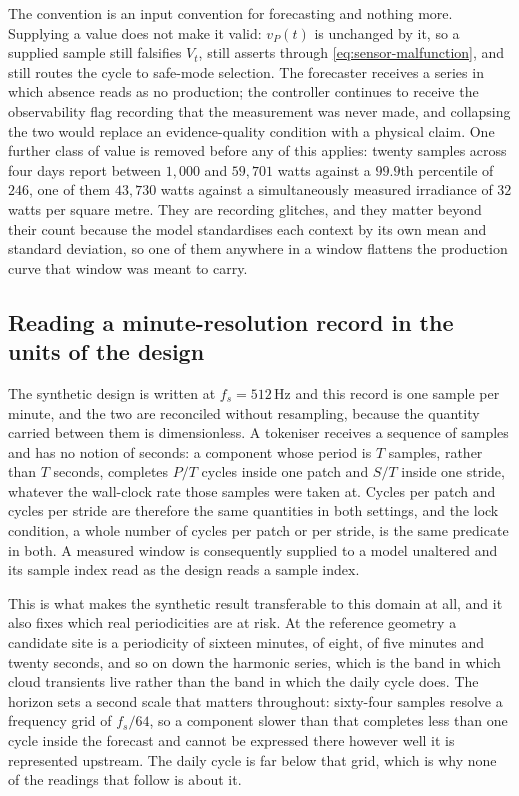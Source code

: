 The convention is an input convention for forecasting and nothing more. Supplying a value does not make it valid: $v_P(t)$ is unchanged by it, so a supplied sample still falsifies $V_t$, still asserts  through \autoref{eq:sensor-malfunction}, and still routes the cycle to safe-mode selection. The forecaster receives a series in which absence reads as no production; the controller continues to receive the observability flag recording that the measurement was never made, and collapsing the two would replace an evidence-quality condition with a physical claim. One further class of value is removed before any of this applies: twenty samples across four days report between $1{,}000$ and $59{,}701$ watts against a $99.9$th percentile of $246$, one of them $43{,}730$ watts against a simultaneously measured irradiance of $32$ watts per square metre. They are recording glitches, and they matter beyond their count because the model standardises each context by its own mean and standard deviation, so one of them anywhere in a window flattens the production curve that window was meant to carry.

\subsection{Reading a minute-resolution record in the units of the design}

The synthetic design is written at $f_s=512$\,Hz and this record is one sample per minute, and the two are reconciled without resampling, because the quantity carried between them is dimensionless. A tokeniser receives a sequence of samples and has no notion of seconds: a component whose period is $T$ samples, rather than $T$ seconds, completes $P/T$ cycles inside one patch and $S/T$ inside one stride, whatever the wall-clock rate those samples were taken at. Cycles per patch and cycles per stride are therefore the same quantities in both settings, and the lock condition, a whole number of cycles per patch or per stride, is the same predicate in both. A measured window is consequently supplied to a model unaltered and its sample index read as the design reads a sample index.

This is what makes the synthetic result transferable to this domain at all, and it also fixes which real periodicities are at risk. At the reference geometry a candidate site is a periodicity of sixteen minutes, of eight, of five minutes and twenty seconds, and so on down the harmonic series, which is the band in which cloud transients live rather than the band in which the daily cycle does. The horizon sets a second scale that matters throughout: sixty-four samples resolve a frequency grid of $f_s/64$, so a component slower than that completes less than one cycle inside the forecast and cannot be expressed there however well it is represented upstream. The daily cycle is far below that grid, which is why none of the readings that follow is about it.


